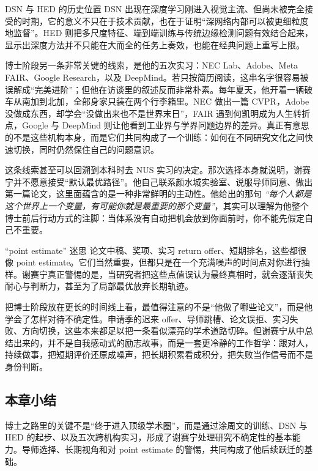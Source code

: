 \begin{knowledgebox}{DSN 与 HED 的历史位置}
DSN 出现在深度学习刚进入视觉主流、但尚未被完全接受的时期，它的意义不只在于技术贡献，也在于证明“深网络内部可以被更细粒度地监督”。HED 则把多尺度特征、端到端训练与传统边缘检测问题有效结合起来，显示出深度方法并不只能在大而全的任务上奏效，也能在经典问题上重写上限。
\end{knowledgebox}

博士阶段另一条非常关键的线索，是他的五次实习：NEC Lab、Adobe、Meta FAIR、Google Research，以及 DeepMind。若只按简历阅读，这串名字很容易被误解成“完美进阶”；但他在访谈里的叙述反而非常朴素。每年夏天，他开着一辆破车从南加到北加，全部身家只装在两个行李箱里。NEC 做出一篇 CVPR，Adobe 没做成东西，却学会“没做出来也不是世界末日”，FAIR 遇到何凯明成为人生转折点，Google 与 DeepMind 则让他看到工业界与学界问题边界的差异。真正有意思的不是这些机构本身，而是它们共同构成了一个训练：如何在不同研究文化之间快速切换，同时仍然保住自己的问题意识。

这条线索甚至可以回溯到本科时去 NUS 实习的决定。那次选择本身就说明，谢赛宁并不愿意接受“默认最优路径”。他自己联系颜水城实验室、说服导师同意、做出第一篇论文，这里面蕴含的是一种非常鲜明的主动性。他给出的那句 \textit{``每个人都是这个世界上一个变量，有可能你就是最重要的那个变量''}，其实可以理解为他整个博士前后行动方式的注脚：当体系没有自动把机会放到你面前时，你不能先假定自己不重要。

\begin{warningbox}{“point estimate” 迷思}
论文中稿、奖项、实习 return offer、短期排名，这些都很像 point estimate。它们当然重要，但都只是在一个充满噪声的时间点对你进行抽样。谢赛宁真正警惕的是，当研究者把这些点值误认为最终真相时，就会逐渐丧失耐心与判断力，甚至为了局部最优放弃长期轨迹。
\end{warningbox}

把博士阶段放在更长的时间线上看，最值得注意的不是“他做了哪些论文”，而是他学会了怎样对待不确定性。申请季的迟来 offer、导师跳槽、论文误拒、实习失败、方向切换，这些本来都足以把一条看似漂亮的学术道路切碎。但谢赛宁从中总结出来的，并不是自我感动式的励志故事，而是一套更冷静的工作哲学：跟对人，持续做事，把短期评价还原成噪声，把长期积累看成积分，把失败当作信号而不是身份判断。

\subsection{本章小结}

博士之路里的关键不是“终于进入顶级学术圈”，而是通过涂周文的训练、DSN 与 HED 的起步、以及五次跨机构实习，形成了谢赛宁处理研究不确定性的基本能力。导师选择、长期视角和对 point estimate 的警惕，共同构成了他后续跃迁的基础。

